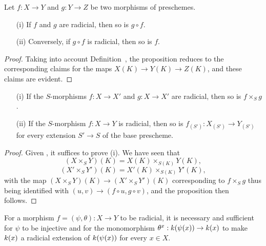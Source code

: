 \begin{proposition}[3.5.6]
\label{I.3.5.6}
Let $f:X\to Y$ and $g:Y\to Z$ be two morphisms of preschemes.
\begin{enumerate}
  \item[{\rm(i)}] If $f$ and $g$ are radicial, then so is $g\circ f$.
  \item[{\rm(ii)}] Conversely, if $g\circ f$ is radicial, then so is $f$.
\end{enumerate}
\end{proposition}

\begin{proof}
Taking into account Definition~, the proposition reduces to the corresponding claims for the maps $X(K)\to Y(K)\to Z(K)$, and these claims are evident.
\end{proof}

\begin{proposition}[3.5.7]
\label{I.3.5.7}
\medskip\noindent
\begin{enumerate}
  \item[{\rm(i)}] If the $S$-morphisms $f:X\to X'$ and $g:X\to X'$ are radicial, then so is $f\times_S g$.
  \item[{\rm(ii)}] If the $S$-morphism $f:X\to Y$ is radicial, then so is $f_{(S')}:X_{(S')}\to Y_{(S')}$ for every extension $S'\to S$ of the base prescheme.
\end{enumerate}
\end{proposition}

\begin{proof}
Given , it suffices to prove (i).
We have seen  that
\[
  (X\times_S Y)(K)=X(K)\times_{S(K)}Y(K),
\]
\[
  (X'\times_S Y')(K)=X'(K)\times_{S(K)}Y'(K),
\]
with the map $(X\times_S Y)(K)\to(X'\times_S Y')(K)$ corresponding to $f\times_S g$ thus being identified with $(u,v)\to(f\circ u,g\circ v)$, and the proposition then follows.
\end{proof}

\begin{proposition}[3.5.8]
\label{I.3.5.8}
For a morphism $f=(\psi,\theta):X\to Y$ to be radicial, it is necessary and sufficient for $\psi$ to be injective and for the monomorphism $\theta^x:\kres(\psi(x))\to\kres(x)$ to make $k(x)$ a radicial extension of $k(\psi(x))$ for every $x\in X$.
\end{proposition}

